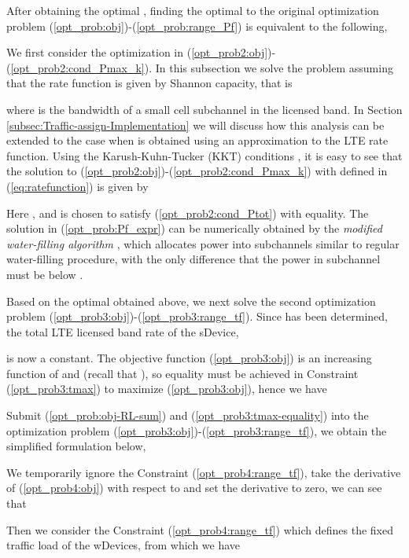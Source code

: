 \documentclass[journal,final,letterpaper,10pt,doublecolumn,twoside]{IEEEtran}
\begin{document}
After obtaining the optimal , finding the optimal  to the original optimization problem (\ref{opt_prob:obj})-(\ref{opt_prob:range_Pf}) is equivalent to the following,

We first consider the optimization in (\ref{opt_prob2:obj})-(\ref{opt_prob2:cond_Pmax_k}).  In this subsection we solve the problem assuming that the rate function  is given by Shannon capacity, that is

where  is the bandwidth of a small cell subchannel in the licensed band.
In Section \ref{subsec:Traffic-assign-Implementation} we will discuss how this analysis can be extended to the case when   is obtained using an approximation to the LTE rate function.
Using the Karush-Kuhn-Tucker (KKT) conditions \cite{ConvexOptimization_textbook},   it is easy to see that the solution to (\ref{opt_prob2:obj})-(\ref{opt_prob2:cond_Pmax_k}) with  defined in (\ref{eq:ratefunction}) is given by

Here , and  is chosen to satisfy (\ref{opt_prob2:cond_Ptot}) with equality.
The solution in (\ref{opt_prob:Pf_expr}) can be numerically obtained by the \emph{modified water-filling algorithm} \cite{cap-limited-water-filling-wcnc2009}\cite{cap-limited-water-filling-EURASIP2008},  which allocates power into subchannels similar to regular water-filling procedure, with the only difference that the power in subchannel  must be below .

Based on the optimal  obtained above, we next solve the second optimization problem (\ref{opt_prob3:obj})-(\ref{opt_prob3:range_tf}).  Since  has been determined, the total LTE licensed band rate of the sDevice,

is now a constant. The objective function (\ref{opt_prob3:obj}) is an increasing function of  and  (recall that ), so equality must be achieved in Constraint (\ref{opt_prob3:tmax}) to maximize (\ref{opt_prob3:obj}), hence we have

Submit (\ref{opt_prob:obj-RL-sum}) and (\ref{opt_prob3:tmax-equality}) into the optimization problem (\ref{opt_prob3:obj})-(\ref{opt_prob3:range_tf}), we obtain the simplified formulation below,

We temporarily ignore the Constraint (\ref{opt_prob4:range_tf}), take the derivative of (\ref{opt_prob4:obj}) with respect to  and set the derivative to zero, we can see that

Then we consider the Constraint (\ref{opt_prob4:range_tf}) which defines the fixed traffic load of the wDevices, from which we have
\end{document}
